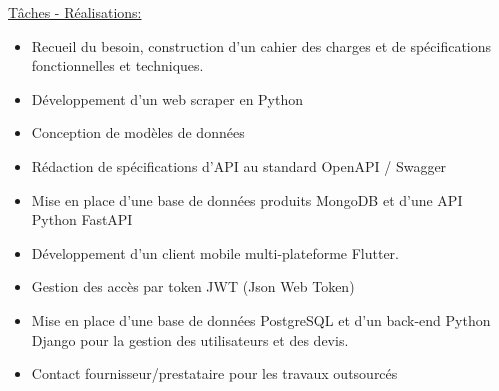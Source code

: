 \documentclass[]{friggeri-cv}
\begin{document}
\vspace{1.5mm}
\underline{Tâches - Réalisations: }\\

\begin{itemize}
\setlength{\itemsep}{1pt}
\setlength{\parskip}{0pt}
\setlength{\parsep}{0pt}

\item Recueil du besoin, construction d'un cahier des charges et de spécifications fonctionnelles et techniques.
\item Développement d'un web scraper en Python
\item Conception de modèles de données
\item Rédaction de spécifications d'API au standard OpenAPI / Swagger
\item Mise en place d'une base de données produits MongoDB et d'une API Python FastAPI
\item Développement d'un client mobile multi-plateforme Flutter.
\item Gestion des accès par token JWT (Json Web Token)
\item Mise en place d'une base de données PostgreSQL et d'un back-end Python Django pour la gestion des utilisateurs et des devis.
\item Contact fournisseur/prestataire pour les travaux outsourcés
\end{itemize}
\end{document}
